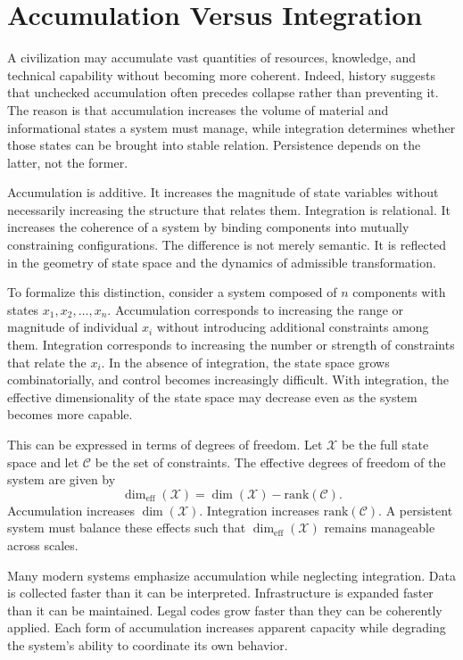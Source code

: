 \documentclass[12pt,oneside]{book}
\begin{document}
\chapter{Accumulation Versus Integration}

A civilization may accumulate vast quantities of resources, knowledge, and technical capability without becoming more coherent. Indeed, history suggests that unchecked accumulation often precedes collapse rather than preventing it. The reason is that accumulation increases the volume of material and informational states a system must manage, while integration determines whether those states can be brought into stable relation. Persistence depends on the latter, not the former.

Accumulation is additive. It increases the magnitude of state variables without necessarily increasing the structure that relates them. Integration is relational. It increases the coherence of a system by binding components into mutually constraining configurations. The difference is not merely semantic. It is reflected in the geometry of state space and the dynamics of admissible transformation.

To formalize this distinction, consider a system composed of \(n\) components with states \(x_1, x_2, \dots, x_n\). Accumulation corresponds to increasing the range or magnitude of individual \(x_i\) without introducing additional constraints among them. Integration corresponds to increasing the number or strength of constraints that relate the \(x_i\). In the absence of integration, the state space grows combinatorially, and control becomes increasingly difficult. With integration, the effective dimensionality of the state space may decrease even as the system becomes more capable.

This can be expressed in terms of degrees of freedom. Let \(\mathcal{X}\) be the full state space and let \(\mathcal{C}\) be the set of constraints. The effective degrees of freedom of the system are given by
\[
\dim_{\mathrm{eff}}(\mathcal{X}) = \dim(\mathcal{X}) - \mathrm{rank}(\mathcal{C}).
\]
Accumulation increases \(\dim(\mathcal{X})\). Integration increases \(\mathrm{rank}(\mathcal{C})\). A persistent system must balance these effects such that \(\dim_{\mathrm{eff}}(\mathcal{X})\) remains manageable across scales.

Many modern systems emphasize accumulation while neglecting integration. Data is collected faster than it can be interpreted. Infrastructure is expanded faster than it can be maintained. Legal codes grow faster than they can be coherently applied. Each form of accumulation increases apparent capacity while degrading the system’s ability to coordinate its own behavior.
\end{document}
